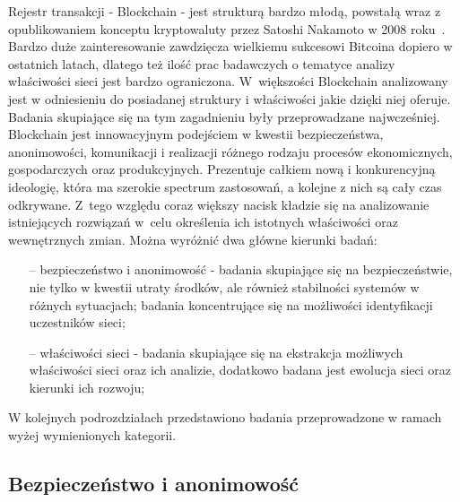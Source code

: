 \documentclass[12pt, oneside, final, openany]{mgr}
\begin{document}
\indent Rejestr transakcji - Blockchain - jest strukturą bardzo młodą, powstałą wraz z opublikowaniem konceptu kryptowaluty przez Satoshi Nakamoto w 2008 roku~\cite{nakamoto2008bitcoin}. Bardzo duże zainteresowanie zawdzięcza wielkiemu sukcesowi Bitcoina dopiero w ostatnich latach, dlatego też ilość prac badawczych o tematyce analizy właściwości sieci jest bardzo ograniczona. W~większości Blockchain analizowany jest w odniesieniu do posiadanej struktury i właściwości jakie dzięki niej oferuje. Badania skupiające się na tym zagadnieniu były przeprowadzane najwcześniej. Blockchain jest innowacyjnym podejściem w kwestii bezpieczeństwa, anonimowości, komunikacji i realizacji różnego rodzaju procesów ekonomicznych, gospodarczych oraz produkcyjnych. Prezentuje całkiem nową i konkurencyjną ideologię, która ma szerokie spectrum zastosowań, a kolejne z nich są cały czas odkrywane. Z~tego względu coraz większy nacisk kładzie się na analizowanie istniejących rozwiązań w~celu określenia ich istotnych właściwości oraz wewnętrznych zmian. Można wyróżnić dwa główne kierunki badań: 
\begin{itemize}
\item[--] bezpieczeństwo i anonimowość -  badania skupiające się na bezpieczeństwie, nie tylko w kwestii utraty środków, ale również stabilności systemów w różnych sytuacjach; badania koncentrujące się na możliwości identyfikacji uczestników sieci; 
\item[--] właściwości sieci - badania skupiające się na ekstrakcja możliwych właściwości sieci oraz ich analizie, dodatkowo badana jest ewolucja sieci oraz kierunki ich rozwoju;
\end{itemize}

\indent W kolejnych podrozdziałach przedstawiono badania przeprowadzone w ramach wyżej wymienionych kategorii.

\subsection{Bezpieczeństwo i anonimowość}
\end{document}

